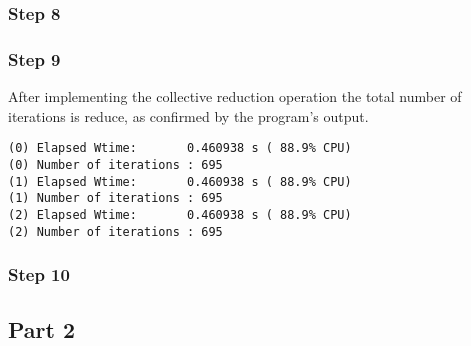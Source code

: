\subsubsection{Step 8}
\subsubsection{Step 9}

After implementing the collective reduction operation the total number of iterations is reduce, as confirmed by the program's output.

\begin{lstlisting}
(0) Elapsed Wtime:       0.460938 s ( 88.9% CPU)
(0) Number of iterations : 695
(1) Elapsed Wtime:       0.460938 s ( 88.9% CPU)
(1) Number of iterations : 695
(2) Elapsed Wtime:       0.460938 s ( 88.9% CPU)
(2) Number of iterations : 695
\end{lstlisting}
\subsubsection{Step 10}


\subsection{Part 2}



